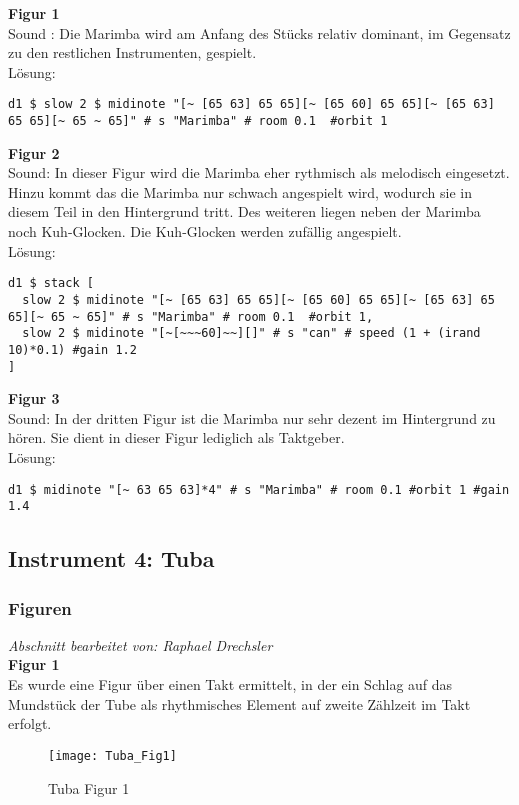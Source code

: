 \documentclass[
10pt, %
a4paper, %
oneside, %
headinclude,footinclude, %
BCOR5mm, %
]{scrartcl}
\begin{document}
\noindent \textbf{Figur 1}\\
Sound : Die Marimba wird am Anfang des Stücks relativ dominant, im Gegensatz zu den restlichen Instrumenten, gespielt.\\
Lösung:
\begin{lstlisting}
d1 $ slow 2 $ midinote "[~ [65 63] 65 65][~ [65 60] 65 65][~ [65 63] 65 65][~ 65 ~ 65]" # s "Marimba" # room 0.1  #orbit 1
\end{lstlisting}
\noindent \textbf{Figur 2}\\
Sound: In dieser Figur wird die Marimba eher rythmisch als melodisch eingesetzt. Hinzu kommt das die Marimba nur schwach angespielt wird, wodurch sie in diesem Teil in den Hintergrund tritt. Des weiteren liegen neben der Marimba noch Kuh-Glocken. Die Kuh-Glocken werden zufällig angespielt.\\
Lösung:
\begin{lstlisting}
d1 $ stack [
  slow 2 $ midinote "[~ [65 63] 65 65][~ [65 60] 65 65][~ [65 63] 65 65][~ 65 ~ 65]" # s "Marimba" # room 0.1  #orbit 1,
  slow 2 $ midinote "[~[~~~60]~~][]" # s "can" # speed (1 + (irand 10)*0.1) #gain 1.2
]
\end{lstlisting}
\noindent \textbf{Figur 3}\\
Sound: In der dritten Figur ist die Marimba nur sehr dezent im Hintergrund zu hören. Sie dient in dieser Figur lediglich als Taktgeber.\\
Lösung:
\begin{lstlisting}
d1 $ midinote "[~ 63 65 63]*4" # s "Marimba" # room 0.1 #orbit 1 #gain 1.4
\end{lstlisting}
\subsection{Instrument 4: Tuba}
\subsubsection{Figuren}
\textit{Abschnitt bearbeitet von: Raphael Drechsler}\\

\noindent\textbf{Figur 1}\\
Es wurde eine Figur über einen Takt ermittelt, in der ein Schlag auf das Mundstück der Tube als rhythmisches Element auf zweite Zählzeit im Takt erfolgt.\\
\begin{figure}[h]
	\centering 
	\texttt{[image: Tuba\_Fig1]} 
	\caption{Tuba Figur 1}
\end{figure}
\end{document}
